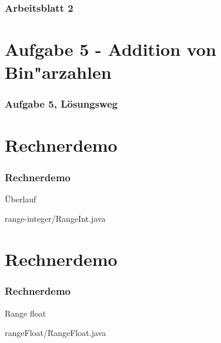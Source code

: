 \documentclass[9pt,german]{beamer}%
\begin{document}
\maketitle%
\addtocounter{framenumber}{-1}%

\begin{frame}
  \frametitle{Arbeitsblatt 2}%
\tableofcontents
\end{frame}
\setcounter{exercise}{4}
\section{Aufgabe 5 - Addition von Bin"arzahlen}



\begin{frame}[t]%
  \frametitle{Aufgabe 5, L\"osungsweg}%
\medskip


\end{frame}

\setcounter{exercise}{6}


\def\stitle{Rechnerdemo}
\section{\stitle}
\begin{frame}[fragile]%
  \frametitle{\stitle}%
\medskip

\"Uberlauf

{range-integer/RangeInt.java}
\end{frame}

\setcounter{exercise}{7}


\def\stitle{Rechnerdemo}
\section{\stitle}
\begin{frame}[fragile]%
  \frametitle{\stitle}%
\medskip

Range float

{rangeFloat/RangeFloat.java}
\end{frame}
\end{document}
